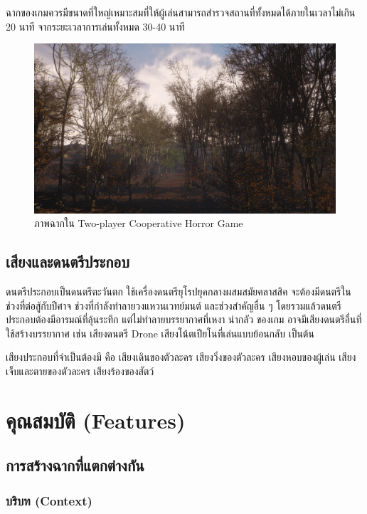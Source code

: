 ฉากของเกมควรมีขนาดที่ใหญ่เหมาะสมที่ให้ผู้เล่นสามารถสำรวจสถานที่ทั้งหมดได้ภายในเวลาไม่เกิน 20 นาที จากระยะเวลาการเล่นทั้งหมด 30-40 นาที

\begin{figure}[h]
  \begin{center}
  \includegraphics[width=\textwidth]{./img/screenshots/dayshot2.png}
  \end{center}
  \caption[ภาพฉากใน Two-player Cooperative Horror Game]{ภาพฉากใน Two-player Cooperative Horror Game}
  \label{fig:gameshot}
\end{figure}
\subsection{เสียงและดนตรีประกอบ}

ดนตรีประกอบเป็นดนตรีตะวันตก ใช้เครื่องดนตรียุโรปยุคกลางผสมสมัยคลาสสิค จะต้องมีดนตรีในช่วงที่ต่อสู้กับปีศาจ ช่วงที่กำลังทำลายวงแหวนเวทย์มนต์ และช่วงสำคัญอื่น ๆ โดยรวมแล้วดนตรีประกอบต้องมีอารมณ์ที่ลุ้นระทึก แต่ไม่ทำลายบรรยากาศที่เหงา น่ากลัว ของเกม อาจมีเสียงดนตรีอื่นที่ใช้สร้างบรรยากาศ เช่น เสียงดนตรี Drone เสียงโน้ตเปียโนที่เล่นแบบย้อนกลับ เป็นต้น

เสียงประกอบที่จำเป็นต้องมี คือ เสียงเดินของตัวละคร เสียงวิ่งของตัวละคร เสียงหอบของผู้เล่น
เสียงเจ็บและตายของตัวละคร เสียงร้องของสัตว์

\section{คุณสมบัติ (Features)}

\subsection{การสร้างฉากที่แตกต่างกัน}

\subsubsection{บริบท (Context)}

